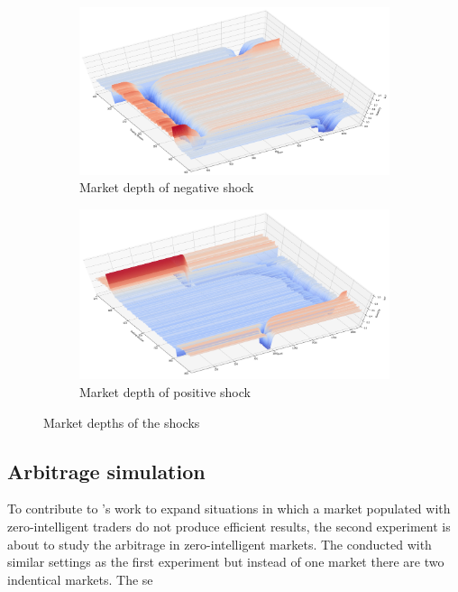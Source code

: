 
\begin{figure}
    \centering
    \begin{subfigure}{.5\textwidth}
      \centering
      \includegraphics[width=\linewidth]{plots/shocks_neg_market_depth_in_equilibrium.png}
      \caption{Market depth of negative shock}
      \label{fig:market_depth_neg_shock}
    \end{subfigure}%
    \begin{subfigure}{.5\textwidth}
      \centering
      \includegraphics[width=\linewidth]{plots/shocks_pos_market_depth_in_equilibrium.png}
      \caption{Market depth of positive shock}
      \label{fig:market_depth_pos_shock}
    \end{subfigure}
    \caption{Market depths of the shocks}
    \label{fig:market_depths_shocks}
\end{figure}


\subsection{Arbitrage simulation}

To contribute to \citet{Mil08}'s work to expand situations in which a market populated with zero-intelligent
traders do not produce efficient results, the second experiment is about to study the arbitrage in 
zero-intelligent markets. The 
conducted with similar settings as the
first experiment but instead of one market there are two indentical markets. The se
